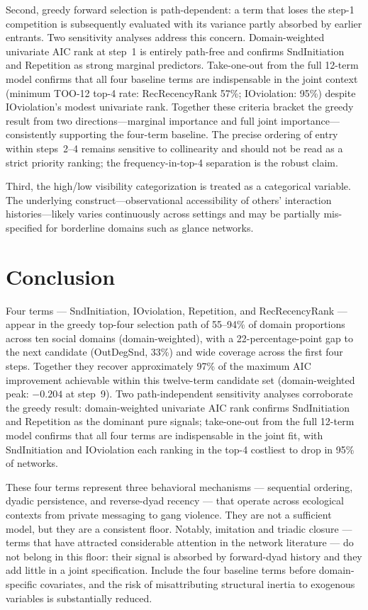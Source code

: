 \documentclass[11pt]{article}
\begin{document}
Second, greedy forward selection is path-dependent: a term that loses the
step-1 competition is subsequently evaluated with its variance partly absorbed
by earlier entrants. Two sensitivity analyses address this concern. Domain-weighted
univariate AIC rank at step~1 is entirely path-free and confirms SndInitiation and
Repetition as strong marginal predictors. Take-one-out from the full 12-term
model confirms that all four baseline terms are indispensable in the joint
context (minimum TOO-12 top-4 rate: RecRecencyRank 57\%; IOviolation: 95\%)
despite IOviolation's modest univariate rank. Together these criteria
bracket the greedy result from two directions---marginal importance and full
joint importance---consistently supporting the four-term baseline. The precise
ordering of entry within steps~2--4 remains sensitive to collinearity and should
not be read as a strict priority ranking; the frequency-in-top-4 separation is
the robust claim.

Third, the high/low visibility categorization is treated as a categorical
variable. The underlying construct---observational accessibility of others'
interaction histories---likely varies continuously across settings and may be
partially mis-specified for borderline domains such as glance networks.


\section{Conclusion}

Four terms --- SndInitiation, IOviolation, Repetition, and RecRecencyRank ---
appear in the greedy top-four selection path of 55--94\% of domain proportions
across ten social domains (domain-weighted), with a 22-percentage-point gap to
the next candidate (OutDegSnd, 33\%) and wide coverage across the first four steps.
Together they recover approximately 97\% of the maximum AIC improvement
achievable within this twelve-term candidate set (domain-weighted peak:
$-0.204$ at step~9). Two path-independent sensitivity analyses corroborate
the greedy result: domain-weighted univariate AIC rank confirms SndInitiation
and Repetition as the dominant pure signals; take-one-out from the full 12-term
model confirms that all four terms are indispensable in the joint fit, with
SndInitiation and IOviolation each ranking in the top-4 costliest to drop in 95\% of networks.

These four terms represent three behavioral mechanisms --- sequential ordering,
dyadic persistence, and reverse-dyad recency --- that operate across ecological
contexts from private messaging to gang violence. They are not a sufficient model,
but they are a consistent floor. Notably, imitation and triadic closure ---
terms that have attracted considerable attention in the network literature ---
do not belong in this floor: their signal is absorbed by forward-dyad history
and they add little in a joint specification. Include the four baseline terms
before domain-specific covariates, and the risk of misattributing structural
inertia to exogenous variables is substantially reduced.
\end{document}
